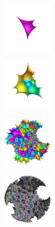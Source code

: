 \documentclass[suppldata, dvipdfmx]{interact}
\theoremstyle{plain}%
\theoremstyle{definition}
\theoremstyle{remark}
\theoremstyle{problemstyle}
\begin{document}
\begin{figure}[h!tbp]
 \begin{minipage}[t]{0.18\textwidth}
  \centering
  \includegraphics[width=1in, height=1in, keepaspectratio]{./img/constructFractal/finiteProcess/step1.jpg}
  \label{fig:sphaira-step1}
 \end{minipage}
 \hspace*{\fill}
 \begin{minipage}[t]{0.18\textwidth}
  \centering
  \includegraphics[width=1in, height=1in, keepaspectratio]{./img/constructFractal/finiteProcess/step2.jpg}
  \label{fig:sphaira-step2}
 \end{minipage}
 \hspace*{\fill}
 \begin{minipage}[t]{0.18\textwidth}
  \centering
  \includegraphics[width=1in, height=1in, keepaspectratio]{./img/constructFractal/finiteProcess/step5.jpg}
  \label{fig:sphaira-step5}
 \end{minipage}
 \hspace*{\fill}
 \begin{minipage}[t]{0.18\textwidth}
  \centering
  \includegraphics[width=1in, height=1in, keepaspectratio]{./img/constructFractal/finiteProcess/step10.jpg}
  \label{fig:sphaira-step10}
 \end{minipage}

\end{figure}
\end{document}
